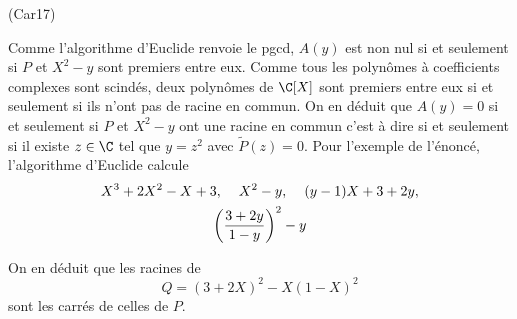 \begin{tiny}(Car17)\end{tiny} Comme l'algorithme d'Euclide renvoie le pgcd, $A(y)$ est non nul si et seulement si $P$ et $X^2-y$ sont premiers entre eux. Comme tous les polynômes à coefficients complexes sont scindés, deux polynômes de $\C[X]$ sont premiers entre eux si et seulement si ils n'ont pas de racine en commun. On en déduit que $A(y)=0$ si et seulement si $P$ et $X^2-y$ ont une racine en commun c'est à dire si et seulement si il existe $z\in \C$ tel que $y=z^2$ avec $\widetilde{P}(z)=0$.\newline
Pour l'exemple de l'énoncé, l'algorithme d'Euclide calcule
\begin{multline*}
 X^3+2X^2-X+3,\hspace{0.4cm} X^2 -y, \hspace{0.4cm} (y-1)X+3+2y, \\
\left( \frac{3+2y}{1-y}\right)^2-y 
\end{multline*}

On en déduit que les racines de 
\begin{displaymath}
 Q = (3+2X)^2 -X(1-X)^2
\end{displaymath}
sont les carrés de celles de $P$. 
